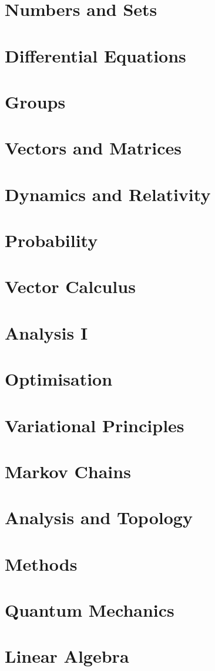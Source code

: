 \documentclass{book}
\begin{document}
\let\maketitle\ignorespaces{}
\renewcommand{\tableofcontentsnewpage}{\minitoc\newpage}

\chapter{Numbers and Sets}

\chapter{Differential Equations}

\chapter{Groups}

\chapter{Vectors and Matrices}

\chapter{Dynamics and Relativity}

\chapter{Probability}

\chapter{Vector Calculus}

\chapter{Analysis I}


\chapter{Optimisation}

\chapter{Variational Principles}

\chapter{Markov Chains}

\chapter{Analysis and Topology}

\chapter{Methods}

\chapter{Quantum Mechanics}

\chapter{Linear Algebra}

\end{document}
